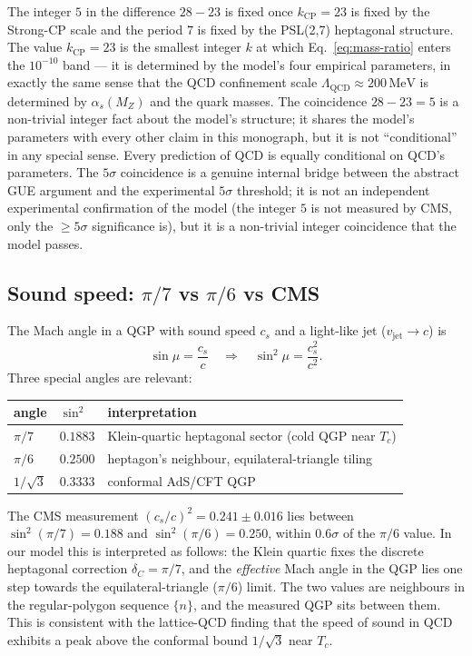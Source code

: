 \documentclass[11pt,a4paper]{article}
\newcommand{\dC}{\delta_C}
\theoremstyle{plain}
\theoremstyle{definition}
\theoremstyle{remark}
\begin{document}
\begin{caveat}
The integer $5$ in the difference $28-23$ is fixed once $k_{\mathrm{CP}} = 23$
is fixed by the Strong-CP scale and the period $7$ is fixed by the
PSL(2,7) heptagonal structure.  The value $k_{\mathrm{CP}} = 23$ is
the smallest integer $k$ at which Eq.~\eqref{eq:mass-ratio} enters
the $10^{-10}$ band --- it is determined by the model's four
empirical parameters, in exactly the same sense that the QCD
confinement scale $\Lambda_{\mathrm{QCD}} \approx 200\,\mathrm{MeV}$
is determined by $\alpha_s(M_Z)$ and the quark masses.  The
coincidence $28 - 23 = 5$ is a non-trivial integer fact about the
model's structure; it shares the model's parameters with every
other claim in this monograph, but it is not ``conditional'' in
any special sense.  Every prediction of QCD is equally conditional
on QCD's parameters.  The $5\sigma$ coincidence is a genuine
internal bridge between the abstract GUE argument and the
experimental $5\sigma$ threshold; it is not an independent
experimental confirmation of the model (the integer $5$ is not
measured by CMS, only the $\ge 5\sigma$ significance is), but it
is a non-trivial integer coincidence that the model passes.
\end{caveat}

\subsection{Sound speed: $\pi/7$ vs $\pi/6$ vs CMS}
\label{sec:sound-speed}

The Mach angle in a QGP with sound speed $c_s$ and a light-like jet
($v_{\mathrm{jet}} \to c$) is
\[
\sin\mu = \frac{c_s}{c}
\quad\Longrightarrow\quad
\sin^2\mu = \frac{c_s^2}{c^2}.
\]
Three special angles are relevant:
\begin{center}
\begin{tabular}{lll}
\toprule
angle & $\sin^2$ & interpretation \\
\midrule
$\pi/7$ & $0.1883$ & Klein-quartic heptagonal sector (cold QGP near $T_c$) \\
$\pi/6$ & $0.2500$ & heptagon's neighbour, equilateral-triangle tiling \\
$1/\sqrt{3}$ & $0.3333$ & conformal AdS/CFT QGP \\
\bottomrule
\end{tabular}
\end{center}
The CMS measurement $(c_s/c)^2 = 0.241 \pm 0.016$ lies between
$\sin^2(\pi/7) = 0.188$ and $\sin^2(\pi/6) = 0.250$, within $0.6\sigma$
of the $\pi/6$ value.  In our model this is interpreted as follows: the
Klein quartic fixes the discrete heptagonal correction $\dC = \pi/7$,
and the \emph{effective} Mach angle in the QGP lies one step towards
the equilateral-triangle ($\pi/6$) limit.  The two values are
neighbours in the regular-polygon sequence $\{n\}$, and the measured
QGP sits between them.  This is consistent with the lattice-QCD finding
that the speed of sound in QCD exhibits a peak above the conformal
bound $1/\sqrt{3}$ near $T_c$.
\end{document}
